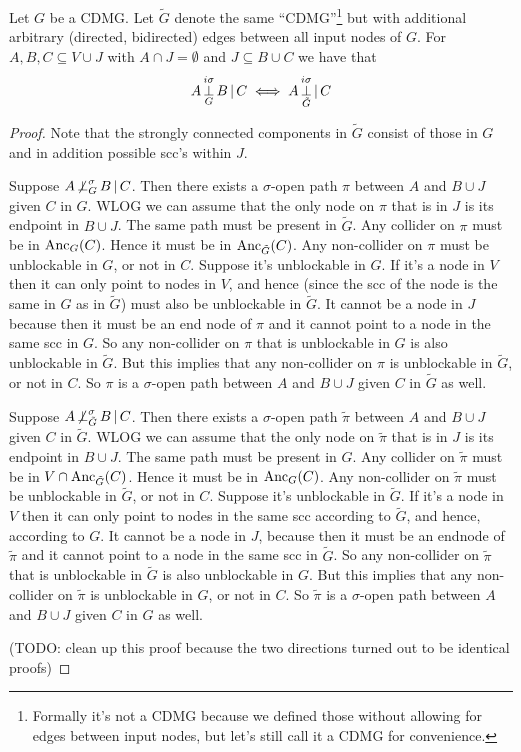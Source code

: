 \begin{Lem}
  Let $G$ be a CDMG. Let $\tilde{G}$ denote the same ``CDMG''\footnote{Formally it's not a CDMG because we defined those without allowing for edges between input nodes, but let's still call it a CDMG for convenience.} but with additional arbitrary (directed, bidirected) edges between all input nodes of $G$.
  For $A, B, C \subseteq V \cup J$ with $A \cap J = \emptyset$ and $J \subseteq B \cup C$ we have that
    $$A \operatorname*{\perp}^{i\sigma}_G B \operatorname*{|} C \iff A \operatorname*{\perp}^{i\sigma}_{\tilde{G}} \operatorname*{|} C$$
\end{Lem}
\begin{proof}
  Note that the strongly connected components in $\tilde{G}$ consist of those in $G$ and in addition possible scc's within $J$.

  Suppose $A \operatorname*{\not\perp}^\sigma_G B \operatorname*{|} C$. 
  Then there exists a $\sigma$-open path $\pi$ between $A$ and $B \cup J$ given $C$ in $G$.
  WLOG we can assume that the only node on $\pi$ that is in $J$ is its endpoint in $B \cup J$.
  The same path must be present in $\tilde{G}$.
  Any collider on $\pi$ must be in $\mathrm{Anc}_G(C)$.
  Hence it must be in $\mathrm{Anc}_{\tilde{G}}(C)$.
  Any non-collider on $\pi$ must be unblockable in $G$, or not in $C$.
  Suppose it's unblockable in $G$.
  If it's a node in $V$ then it can only point to nodes in $V$, and hence (since the scc of the node is the same in $G$ as in $\tilde{G}$) must also be unblockable in $\tilde{G}$.
  It cannot be a node in $J$ because then it must be an end node of $\pi$ and it cannot point to a node in the same scc in $G$.
  So any non-collider on $\pi$ that is unblockable in $G$ is also unblockable in $\tilde{G}$.
  But this implies that any non-collider on $\pi$ is unblockable in $\tilde{G}$, or not in $C$.
  So $\pi$ is a $\sigma$-open path between $A$ and $B \cup J$ given $C$ in $\tilde{G}$ as well.

  Suppose $A \operatorname*{\not\perp}^\sigma_{\tilde{G}} B \operatorname*{|} C$. 
  Then there exists a $\sigma$-open path $\tilde{\pi}$ between $A$ and $B \cup J$ given $C$ in $\tilde{G}$.
  WLOG we can assume that the only node on $\tilde{\pi}$ that is in $J$ is its endpoint in $B \cup J$.
  The same path must be present in $G$.
  Any collider on $\tilde{\pi}$ must be in $V \cap \mathrm{Anc}_{\tilde{G}}(C)$.
  Hence it must be in $\mathrm{Anc}_G(C)$.
  Any non-collider on $\tilde{\pi}$ must be unblockable in $\tilde{G}$, or not in $C$.
  Suppose it's unblockable in $\tilde{G}$.
  If it's a node in $V$ then it can only point to nodes in the same scc according to $\tilde{G}$, and hence, according to $G$.
  It cannot be a node in $J$, because then it must be an endnode of $\tilde{\pi}$ and it cannot point to a node in the same scc in $\tilde{G}$.
  So any non-collider on $\tilde{\pi}$ that is unblockable in $\tilde{G}$ is also unblockable in $G$.
  But this implies that any non-collider on $\tilde{\pi}$ is unblockable in $G$, or not in $C$.
  So $\tilde{\pi}$ is a $\sigma$-open path between $A$ and $B \cup J$ given $C$ in $G$ as well.

  (TODO: clean up this proof because the two directions turned out to be identical proofs)
\end{proof}

